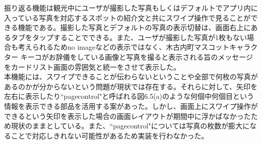 振り返る機能は観光中にユーザが撮影した写真もしくはデフォルトでアプリ内に入っている写真を対応するスポットの紹介文と共にスワイプ操作で見ることができる機能である。撮影した写真とデフォルトの写真の表示切替は、画面右上にあるタブをタップすることでできる。また、ユーザが撮影した写真が1枚もない場合も考えられるためno imageなどの表示ではなく、木古内町マスコットキャラクター キーコがお辞儀をしている画像と写真を撮ると表示される旨のメッセージをカードリスト画面の雰囲気と統一をさせて表示した。\\
本機能には、スワイプできることが伝わらないということや全部で何枚の写真があるのかが分からないという問題が現状では存在する。それらに対して、矢印を左右に表示したり``pagecontrol"と呼ばれる図6.5(a)のような何個中何個目という情報を表示できる部品を活用する案があった。しかし、画面上にスワイプ操作ができるという矢印を表示した場合の画面レイアウトが期間中に浮かばなかったため現状のままとしている。また、``pagecontrol"については写真の枚数が膨大になることで対応しきれない可能性があるため実装を行わなかった。

\newpage

